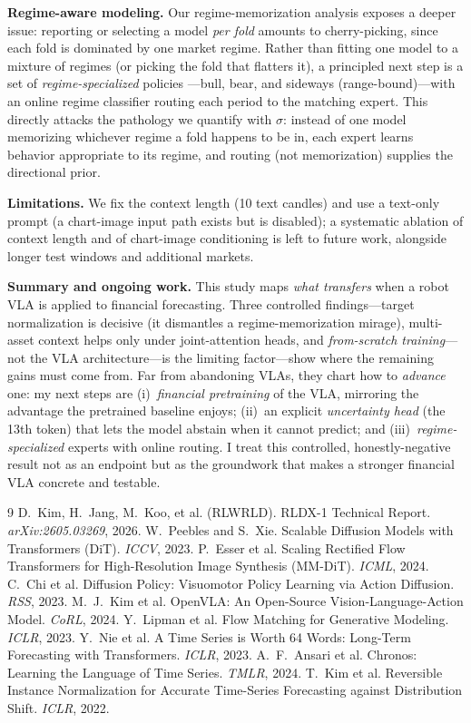 \documentclass[10pt]{article}
\begin{document}
\noindent\textbf{Regime-aware modeling.} Our regime-memorization analysis exposes a deeper issue:
reporting or selecting a model \emph{per fold} amounts to cherry-picking, since each fold is
dominated by one market regime. Rather than fitting one model to a mixture of regimes (or picking
the fold that flatters it), a principled next step is a set of \emph{regime-specialized} policies
---bull, bear, and sideways (range-bound)---with an online regime classifier routing each period
to the matching expert. This directly attacks the pathology we quantify with $\sigma$: instead of
one model memorizing whichever regime a fold happens to be in, each expert learns behavior
appropriate to its regime, and routing (not memorization) supplies the directional prior.

\noindent\textbf{Limitations.} We fix the context length (10 text candles) and use a text-only
prompt (a chart-image input path exists but is disabled); a systematic ablation of context length
and of chart-image conditioning is left to future work, alongside longer test windows and
additional markets.

\noindent\textbf{Summary and ongoing work.} This study maps \emph{what transfers} when a robot VLA
is applied to financial forecasting. Three controlled findings---target normalization is decisive
(it dismantles a regime-memorization mirage), multi-asset context helps only under joint-attention
heads, and \emph{from-scratch training}---not the VLA architecture---is the limiting factor---show
where the remaining gains must come from. Far from abandoning VLAs, they chart how to \emph{advance}
one: my next steps are (i)~\emph{financial pretraining} of the VLA, mirroring the advantage the
pretrained baseline enjoys; (ii)~an explicit \emph{uncertainty head} (the 13th token) that lets the
model abstain when it cannot predict; and (iii)~\emph{regime-specialized} experts with online
routing. I treat this controlled, honestly-negative result not as an endpoint but as the groundwork
that makes a stronger financial VLA concrete and testable.

\begin{thebibliography}{9}
\small
{} D.~Kim, H.~Jang, M.~Koo, et al. (RLWRLD). RLDX-1 Technical Report.
\emph{arXiv:2605.03269}, 2026.
 W.~Peebles and S.~Xie. Scalable Diffusion Models with Transformers (DiT).
\emph{ICCV}, 2023.
 P.~Esser et al. Scaling Rectified Flow Transformers for High-Resolution Image
Synthesis (MM-DiT). \emph{ICML}, 2024.
 C.~Chi et al. Diffusion Policy: Visuomotor Policy Learning via Action Diffusion.
\emph{RSS}, 2023.
 M.~J.~Kim et al. OpenVLA: An Open-Source Vision-Language-Action Model.
\emph{CoRL}, 2024.
 Y.~Lipman et al. Flow Matching for Generative Modeling. \emph{ICLR}, 2023.
 Y.~Nie et al. A Time Series is Worth 64 Words: Long-Term Forecasting with
Transformers. \emph{ICLR}, 2023.
 A.~F.~Ansari et al. Chronos: Learning the Language of Time Series.
\emph{TMLR}, 2024.
 T.~Kim et al. Reversible Instance Normalization for Accurate Time-Series
Forecasting against Distribution Shift. \emph{ICLR}, 2022.
\end{thebibliography}
\end{document}
